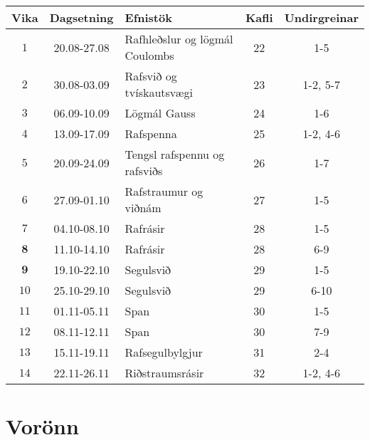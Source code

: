\begin{table}[H]
    \centering
    \begin{tabular}{|c|c|l|c|c|}
    \hline
       \textbf{Vika}  & \textbf{Dagsetning} & \textbf{Efnistök} & \textbf{Kafli} & \textbf{Undirgreinar}  \\ \hline \hline
        $1$ & 20.08-27.08 & Rafhleðslur og lögmál Coulombs & 22 & 1-5 \\ \hline
        $2$ & 30.08-03.09 &  Rafsvið og tvískautsvægi & 23 & 1-2, 5-7 \\ \hline
        $3$ & 06.09-10.09 & Lögmál Gauss & 24 & 1-6 \\ \hline
        $4$ & 13.09-17.09 & Rafspenna & 25 & 1-2, 4-6 \\ \hline
        $5$ & 20.09-24.09 & Tengsl rafspennu og rafsviðs & 26 & 1-7 \\ \hline
        $6$ & 27.09-01.10 & Rafstraumur og viðnám & 27 & 1-5 \\ \hline
        $7$ & 04.10-08.10 & Rafrásir & 28 & 1-5 \\ \hline
        $\mathbf{8}$ & 11.10-14.10 & Rafrásir & 28 & 6-9 \\ \hline
        $\mathbf{9}$ & 19.10-22.10 & Segulsvið & 29 & 1-5 \\ \hline
        $10$ & 25.10-29.10 & Segulsvið & 29 & 6-10 \\ \hline
        $11$ & 01.11-05.11 & Span & 30 & 1-5 \\ \hline
        $12$ & 08.11-12.11 & Span  & 30  & 7-9 \\ \hline
        $13$ & 15.11-19.11 & Rafsegulbylgjur & 31 & 2-4 \\ \hline
        $14$ & 22.11-26.11 & Riðstraumsrásir & 32 & 1-2, 4-6 \\ \hline
    \end{tabular}
\end{table}

\section*{Vorönn}

